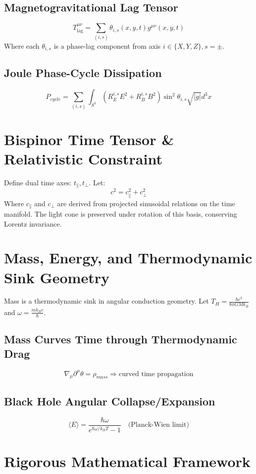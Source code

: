 ﻿\documentclass[12pt]{article}
\begin{document}
\subsection{Magnetogravitational Lag Tensor}
$$ T^{\mu\nu}_{\text{lag}} = \sum_{(i,s)} \theta_{i,s}(x,y,t) g^{\mu\nu}(x,y,t) $$
Where each $\theta_{i,s}$ is a phase-lag component from axis $i \in \{X,Y,Z\}, s=\pm$.

\subsection{Joule Phase-Cycle Dissipation}
$$ P_{cycle}=\sum_{(i,s)}\int_{S^3}(R_E^{i,s}E^2+R_B^{i,s}B^2)\sin^2\theta_{i,s}\sqrt{|g|}d^3x $$

\section{Bispinor Time Tensor \& Relativistic Constraint}
Define dual time axes: $t_{\parallel}, t_{\perp}$. Let:
$$ c^2 = c_{\parallel}^2 + c_{\perp}^2 $$
Where $c_{\parallel}$ and $c_{\perp}$ are derived from projected sinusoidal relations on the time manifold. The light cone is preserved under rotation of this basis, conserving Lorentz invariance.

\section{Mass, Energy, and Thermodynamic Sink Geometry}
Mass is a thermodynamic sink in angular conduction geometry.
Let $T_H = \tfrac{\hbar c^3}{8\pi GMk_B}$ and $\omega = \tfrac{m k_B c}{\hbar}$.

\subsection{Mass Curves Time through Thermodynamic Drag}
$$ \nabla_\mu \partial^\mu \theta = \rho_{mass} \Rightarrow \text{curved time propagation} $$

\subsection{Black Hole Angular Collapse/Expansion}
$$ \langle E\rangle=\frac{\hbar\omega}{e^{\hbar\omega/k_BT}-1} \quad \text{(Planck-Wien limit)} $$

\section{Rigorous Mathematical Framework}
\end{document}
